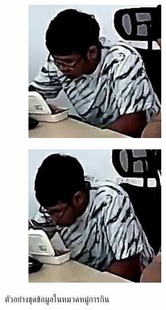 \begin{figure}[!ht]
\begin{subfigure}[b]{0.45\linewidth}
    \end{subfigure}
    \begin{subfigure}[b]{0.45\linewidth}
      \includegraphics[width=\linewidth]{appendix/eat/001_CXS1_D0_001110.jpg}
    \end{subfigure}
    \begin{subfigure}[b]{0.45\linewidth}
      \includegraphics[width=\linewidth]{appendix/eat/001_CXS1_D0_001397.jpg}
    \end{subfigure}
    \caption{ตัวอย่างชุดข้อมูลในหมวดหมู่การกิน}
    \label{fig:result_track}
  \end{figure}

